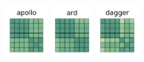 \documentclass[10pt,conference]{IEEEtran}
\begin{document}
\def \heatmapWidth {16mm}
\begin{figure}[htb!]
\centering
\centering
 \includegraphics[width=\heatmapWidth, keepaspectratio]{correlations-classic/apollo-grids.png}
 \includegraphics[width=\heatmapWidth, keepaspectratio]{correlations-classic/arduino-grids.png}
 \includegraphics[width=\heatmapWidth, keepaspectratio]{correlations-classic/dagger-grids.png}

\end{figure}
\end{document}

